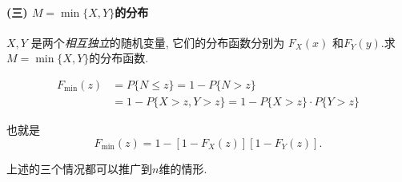 \paragraph{(三) $M=\min \{X, Y\}$的分布}

$X, Y$ 是两个\emph{相互独立}的随机变量, 它们的分布函数分别为 $F_X(x)$ 和$F_Y(y)$.求 $M=\min \{X, Y\}$的分布函数.


   $$
\begin{aligned}
F_{\min }(z) & =P\{N \leq z\}=1-P\{N>z\} \\
& =1-P\{X>z, Y>z\}=1-P\{X>z\} \cdot P\{Y>z\}
\end{aligned}
$$

也就是
$$
F_{\min }(z)=1-\left[1-F_X(z)\right]\left[1-F_Y(z)\right] .
$$

上述的三个情况都可以推广到$n$维的情形.